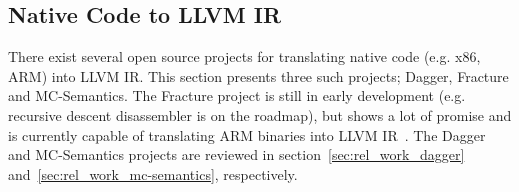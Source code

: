 
\subsection{Native Code to LLVM IR}
\label{sec:rel_work_native_code_to_llvm_ir}

There exist several open source projects for translating native code (e.g. x86, ARM) into LLVM IR. This section presents three such projects; Dagger, Fracture and MC-Semantics. The Fracture project is still in early development (e.g. recursive descent disassembler is on the roadmap), but shows a lot of promise and is currently capable of translating ARM binaries into LLVM IR~\cite{fracture}. The Dagger and MC-Semantics projects are reviewed in section~\ref{sec:rel_work_dagger} and~\ref{sec:rel_work_mc-semantics}, respectively.




